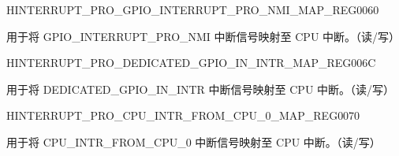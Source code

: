 \begin{register}{H}{INTERRUPT\_PRO\_GPIO\_INTERRUPT\_PRO\_NMI\_MAP\_REG}{\hexprefix{}0060}\label{regdesc:INTERRUPTPROGPIOINTERRUPTPRONMIMAPREG}
%
%
\regnewline%
\begin{regdesc}\begin{reglist}
\label{fielddesc:INTERRUPTPROGPIOINTERRUPTPRONMIMAP}\item [INTERRUPT\_PRO\_GPIO\_INTERRUPT\_PRO\_NMI\_MAP] 用于将 GPIO\_INTERRUPT\_PRO\_NMI 中断信号映射至 CPU 中断。（读/写）
\end{reglist}\end{regdesc}
\end{register}






\begin{register}{H}{INTERRUPT\_PRO\_DEDICATED\_GPIO\_IN\_INTR\_MAP\_REG}{\hexprefix{}006C}\label{regdesc:INTERRUPTPRODEDICATEDGPIOININTRMAPREG}
%
%
\regnewline%
\begin{regdesc}\begin{reglist}
\label{fielddesc:INTERRUPTPRODEDICATEDGPIOININTRMAP}\item [INTERRUPT\_PRO\_DEDICATED\_GPIO\_IN\_INTR\_MAP] 用于将 DEDICATED\_GPIO\_IN\_INTR 中断信号映射至 CPU 中断。（读/写）
\end{reglist}\end{regdesc}
\end{register}


\begin{register}{H}{INTERRUPT\_PRO\_CPU\_INTR\_FROM\_CPU\_0\_MAP\_REG}{\hexprefix{}0070}\label{regdesc:INTERRUPTPROCPUINTRFROMCPU0MAPREG}
%
%
\regnewline%
\begin{regdesc}\begin{reglist}
\label{fielddesc:INTERRUPTPROCPUINTRFROMCPU0MAP}\item [INTERRUPT\_PRO\_CPU\_INTR\_FROM\_CPU\_0\_MAP] 用于将 CPU\_INTR\_FROM\_CPU\_0 中断信号映射至 CPU 中断。（读/写）
\end{reglist}\end{regdesc}
\end{register}



